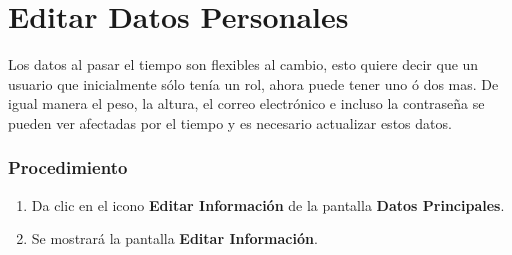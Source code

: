 \section{Editar Datos Personales}

Los datos al pasar el tiempo son flexibles al cambio, esto quiere decir que un usuario que inicialmente sólo tenía un rol, ahora puede tener uno ó dos mas. De igual manera el peso, la altura, el correo electrónico e incluso la contraseña se pueden ver afectadas por el tiempo y es necesario actualizar estos datos.

\subsubsection{Procedimiento}
\begin{enumerate}
	
	\item Da clic en el icono \textbf{Editar Información} de la pantalla \textbf{Datos Principales}.

	\item Se mostrará la pantalla \textbf{Editar Información}.
	

\end{enumerate}
